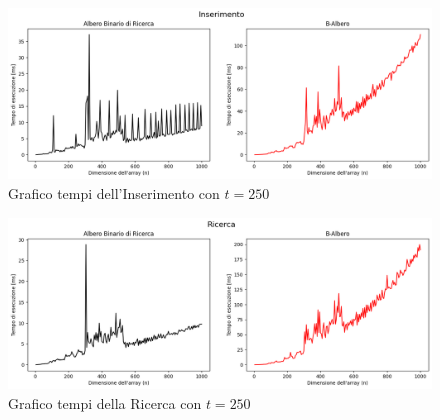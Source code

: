 \begin{figure}[H]
    \centering
    \includegraphics[width=\textwidth]{side-graphs/insert-ms-t250.png}
    \caption{Grafico tempi dell'Inserimento con $t=250$}
    \label{fig:sidegraphinserttimet250}
\end{figure}
    
\begin{figure}[H]
    \centering
    \includegraphics[width=\textwidth]{side-graphs/search-ms-t250.png}
    \caption{Grafico tempi della Ricerca con $t=250$}    
    \label{fig:sidegraphsearchtimet250}
\end{figure}

